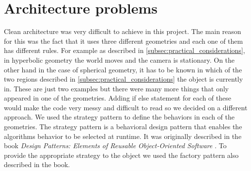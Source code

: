 \section{Architecture problems} \label{sec:architecture_problems}
Clean architecture was very difficult to achieve in this project.
The main reason for this was the fact that it uses three different geometries and each one of them has different rules.
For example as described in \autoref{subsec:practical_considerations}, in hyperbolic geometry the world moves and the camera is stationary.
On the other hand in the case of spherical geometry, it has to be known in which of the two regions described in \autoref{subsec:practical_considerations} the object is currently in.
These are just two examples but there were many more things that only appeared in one of the geometries.
Adding if else statement for each of these would make the code very messy and difficult to read so we decided on a different approach.
We used the strategy pattern to define the behaviors in each of the geometries.
The strategy pattern is a behavioral design pattern that enables the algorithms behavior to be selected at runtime.
It was originally described in the book \textit{Design Patterns: Elements of Reusable Object-Oriented Software} \cite{Design-Patterns}.
To provide the appropriate strategy to the object we used the factory pattern also described in the book.
